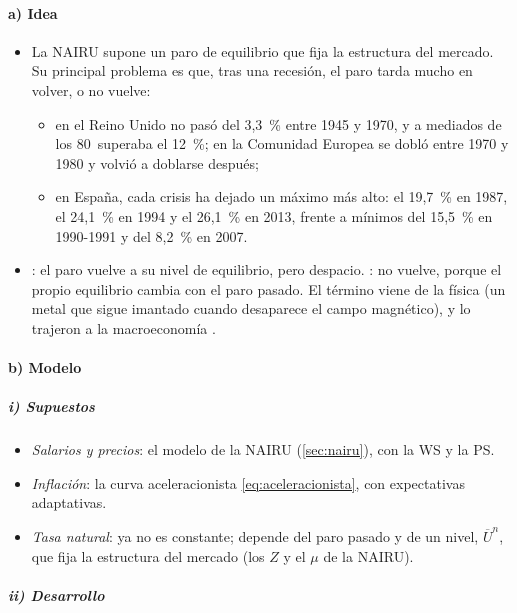 \documentclass[11pt]{article}
\begin{document}
\paragraph{a) Idea}

\begin{itemize}
\item La NAIRU supone un paro de equilibrio que fija la estructura del mercado. Su principal problema es que, tras una recesión, el paro tarda mucho en volver, o no vuelve:
  \begin{itemize}
  \item en el Reino Unido no pasó del 3,3~\% entre 1945 y 1970, y a mediados de los 80~superaba el 12~\%; en la Comunidad Europea se dobló entre 1970 y 1980 y volvió a doblarse después\nocite{BlanchardSummers1986Hysteresis};
  \item en España, cada crisis ha dejado un máximo más alto: el 19,7~\% en 1987, el 24,1~\% en 1994 y el 26,1~\% en 2013, frente a mínimos del 15,5~\% en 1990-1991 y del 8,2~\% en 2007\nocite{CE2026AMECOParo}.
  \end{itemize}
\item {}: el paro vuelve a su nivel de equilibrio, pero despacio. : no vuelve, porque el propio equilibrio cambia con el paro pasado. El término viene de la física (un metal que sigue imantado cuando desaparece el campo magnético), y lo trajeron a la macroeconomía \textcite{BlanchardSummers1986Hysteresis}.
\end{itemize}

\paragraph{b) Modelo}

\subparagraph{i) Supuestos}

\begin{itemize}
\item \emph{Salarios y precios}: el modelo de la NAIRU (\ref{sec:nairu}), con la WS y la PS.
\item \emph{Inflación}: la curva aceleracionista \eqref{eq:aceleracionista}, con expectativas adaptativas.
\item \emph{Tasa natural}: ya no es constante; depende del paro pasado y de un nivel, $\overline U^n$, que fija la estructura del mercado (los $Z$ y el $\mu$ de la NAIRU).
\end{itemize}

\subparagraph{ii) Desarrollo}
\end{document}
